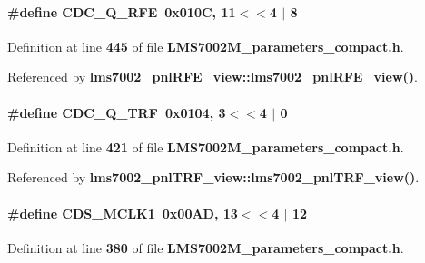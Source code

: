 \paragraph[{C\+D\+C\+\_\+\+Q\+\_\+\+R\+FE}]{\setlength{\rightskip}{0pt plus 5cm}\#define C\+D\+C\+\_\+\+Q\+\_\+\+R\+FE~0x010\+C, 11$<$$<$4 $\vert$  8}\label{LMS7002M__parameters__compact_8h_abbec3b519e89c968ff7bb5f6fa7da448}


Definition at line {\bf 445} of file {\bf L\+M\+S7002\+M\+\_\+parameters\+\_\+compact.\+h}.



Referenced by {\bf lms7002\+\_\+pnl\+R\+F\+E\+\_\+view\+::lms7002\+\_\+pnl\+R\+F\+E\+\_\+view()}.

\paragraph[{C\+D\+C\+\_\+\+Q\+\_\+\+T\+RF}]{\setlength{\rightskip}{0pt plus 5cm}\#define C\+D\+C\+\_\+\+Q\+\_\+\+T\+RF~0x0104, 3$<$$<$4 $\vert$  0}\label{LMS7002M__parameters__compact_8h_a69e8c6a0fd64c45239b690e78c95e397}


Definition at line {\bf 421} of file {\bf L\+M\+S7002\+M\+\_\+parameters\+\_\+compact.\+h}.



Referenced by {\bf lms7002\+\_\+pnl\+T\+R\+F\+\_\+view\+::lms7002\+\_\+pnl\+T\+R\+F\+\_\+view()}.

\paragraph[{C\+D\+S\+\_\+\+M\+C\+L\+K1}]{\setlength{\rightskip}{0pt plus 5cm}\#define C\+D\+S\+\_\+\+M\+C\+L\+K1~0x00\+A\+D, 13$<$$<$4 $\vert$  12}\label{LMS7002M__parameters__compact_8h_a6996e5fc8a744ec917bf63c4f9038826}


Definition at line {\bf 380} of file {\bf L\+M\+S7002\+M\+\_\+parameters\+\_\+compact.\+h}.



